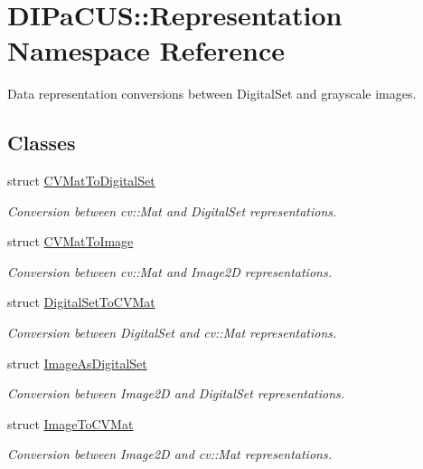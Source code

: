 \hypertarget{namespaceDIPaCUS_1_1Representation}{}\section{D\+I\+Pa\+C\+US\+:\+:Representation Namespace Reference}
\label{namespaceDIPaCUS_1_1Representation}


Data representation conversions between Digital\+Set and grayscale images.  


\subsection*{Classes}
\begin{DoxyCompactItemize}
\item 
struct \mbox{\hyperlink{structDIPaCUS_1_1Representation_1_1CVMatToDigitalSet}{C\+V\+Mat\+To\+Digital\+Set}}
\begin{DoxyCompactList}\small\item\em Conversion between cv\+::\+Mat and Digital\+Set representations. \end{DoxyCompactList}\item 
struct \mbox{\hyperlink{structDIPaCUS_1_1Representation_1_1CVMatToImage}{C\+V\+Mat\+To\+Image}}
\begin{DoxyCompactList}\small\item\em Conversion between cv\+::\+Mat and Image2D representations. \end{DoxyCompactList}\item 
struct \mbox{\hyperlink{structDIPaCUS_1_1Representation_1_1DigitalSetToCVMat}{Digital\+Set\+To\+C\+V\+Mat}}
\begin{DoxyCompactList}\small\item\em Conversion between Digital\+Set and cv\+::\+Mat representations. \end{DoxyCompactList}\item 
struct \mbox{\hyperlink{structDIPaCUS_1_1Representation_1_1ImageAsDigitalSet}{Image\+As\+Digital\+Set}}
\begin{DoxyCompactList}\small\item\em Conversion between Image2D and Digital\+Set representations. \end{DoxyCompactList}\item 
struct \mbox{\hyperlink{structDIPaCUS_1_1Representation_1_1ImageToCVMat}{Image\+To\+C\+V\+Mat}}
\begin{DoxyCompactList}\small\item\em Conversion between Image2D and cv\+::\+Mat representations. \end{DoxyCompactList}\end{DoxyCompactItemize}


